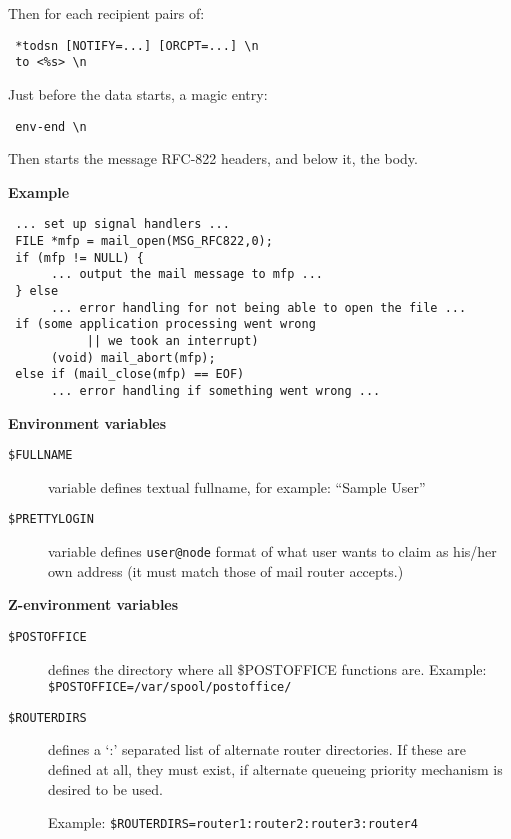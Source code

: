 Then for each recipient pairs of:
\begin{tscreen}
\begin{verbatim}
 *todsn [NOTIFY=...] [ORCPT=...] \n
 to <%s> \n
\end{verbatim}
\end{tscreen}


Just before the data starts, a magic entry:
\begin{tscreen}
\begin{verbatim}
 env-end \n
\end{verbatim}
\end{tscreen}


Then starts the message RFC-822 headers, and below it, the body.

{\bf Example}

\begin{tscreen}
\begin{verbatim}
 ... set up signal handlers ...
 FILE *mfp = mail_open(MSG_RFC822,0);
 if (mfp != NULL) {
      ... output the mail message to mfp ...
 } else
      ... error handling for not being able to open the file ...
 if (some application processing went wrong
           || we took an interrupt)
      (void) mail_abort(mfp);
 else if (mail_close(mfp) == EOF)
      ... error handling if something went wrong ...
\end{verbatim}
\end{tscreen}


{\bf Environment variables}

\begin{description}


\item[ {\tt \$FULLNAME}] \mbox{}

variable defines textual fullname, 
for example: ``Sample User''



\item[ {\tt \$PRETTYLOGIN}] \mbox{}

variable defines 
{\tt user@node} format of what user wants to claim as 
his/her own address (it must match those of mail router accepts.)

\end{description}


{\bf Z-environment variables}
\begin{description}


\item[ {\tt \$POSTOFFICE}] \mbox{}

defines the directory where all 
\$POSTOFFICE functions are. 
Example: {\tt \$POSTOFFICE=/var/spool/postoffice/}



\item[ {\tt \$ROUTERDIRS}] \mbox{}

defines a `:' separated list of alternate 
router directories. If these are defined at all, they must exist, 
if alternate queueing priority mechanism is desired to be used. 

Example: {\tt \$ROUTERDIRS=router1:router2:router3:router4}

\end{description}

